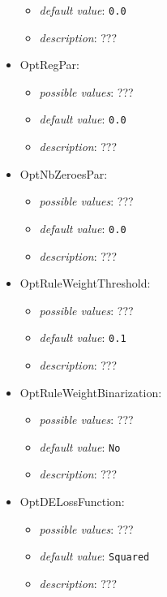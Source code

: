 \documentclass{article}
\begin{document}
\begin{itemize}
\begin{itemize}
                \item \emph{default value}: \texttt{0.0}
                \item \emph{description}: ???
           \end{itemize}
    \item OptRegPar:
           \begin{itemize}
                \item \emph{possible values}: ???
                \item \emph{default value}: \texttt{0.0}
                \item \emph{description}: ???
           \end{itemize}
    \item OptNbZeroesPar:
           \begin{itemize}
                \item \emph{possible values}: ???
                \item \emph{default value}: \texttt{0.0}
                \item \emph{description}: ???
           \end{itemize}
    \item OptRuleWeightThreshold:
           \begin{itemize}
                \item \emph{possible values}: ???
                \item \emph{default value}: \texttt{0.1}
                \item \emph{description}: ???
           \end{itemize}
    \item OptRuleWeightBinarization:
           \begin{itemize}
                \item \emph{possible values}: ???
                \item \emph{default value}: \texttt{No}
                \item \emph{description}: ???
           \end{itemize}
    \item OptDELossFunction:
           \begin{itemize}
                \item \emph{possible values}: ???
                \item \emph{default value}: \texttt{Squared}
                \item \emph{description}: ???
           \end{itemize}

\end{itemize}
\end{document}

